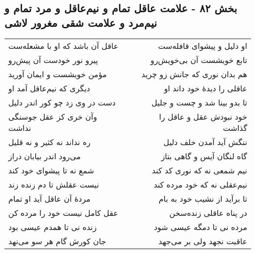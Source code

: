 \begin{center}
\section*{بخش ۸۲ - علامت عاقل تمام و نیم‌عاقل و مرد تمام و نیم‌مرد و علامت شقی مغرور لاشی}
\label{sec:sh082}
\begin{longtable}{l p{0.5cm} r}
عاقل آن باشد که او با مشعله‌ست
&&
او دلیل و پیشوای قافله‌ست
\\
پیرو نور خودست آن پیش‌رو
&&
تابع خویشست آن بی‌خویش‌رو
\\
مؤمن خویشست و ایمان آورید
&&
هم بدان نوری که جانش زو چرید
\\
دیگری که نیم‌عاقل آمد او
&&
عاقلی را دیدهٔ خود داند او
\\
دست در وی زد چو کور اندر دلیل
&&
تا بدو بینا شد و چست و جلیل
\\
وآن خری کز عقل جوسنگی نداشت
&&
خود نبودش عقل و عاقل را گذاشت
\\
ره نداند نه کثیر و نه قلیل
&&
ننگش آید آمدن خلف دلیل
\\
می‌رود اندر بیابان دراز
&&
گاه لنگان آیس و گاهی بتاز
\\
شمع نه تا پیشوای خود کند
&&
نیم شمعی نه که نوری کد کند
\\
نیست عقلش تا دم زنده زند
&&
نیم‌عقلی نه که خود مرده کند
\\
مردهٔ آن عاقل آید او تمام
&&
تا برآید از نشیب خود به بام
\\
عقل کامل نیست خود را مرده کن
&&
در پناه عاقلی زنده‌سخن
\\
زنده نی تا همدم عیسی بود
&&
مرده نی تا دمگه عیسی شود
\\
جان کورش گام هر سو می‌نهد
&&
عاقبت نجهد ولی بر می‌جهد
\\
\end{longtable}
\end{center}
